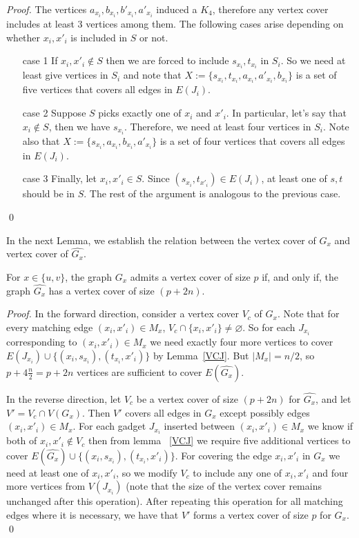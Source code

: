 \documentclass[svgnames]{llncs}
\begin{document}
{\begin{proof}
The vertices $a_{x_i},b_{x_i},b'_{x_i},a'_{x_i}$ induced a $K_4$, therefore any vertex cover includes at least 3 vertices among them. The following cases arise depending on whether $x_i,x'_{i}$ is included in $S$ or not.
\begin{itemize}
 \item [case 1] If $x_i,x'_i \notin S$ then we are forced to include $s_{x_i},t_{x_i}$ in $S_i$. So we need at least give vertices in $S_i$ and note that $X := \{s_{x_i},t_{x_i},a_{x_i},a'_{x_i},b_{x_i}\}$ is a set of five vertices that covers all edges in $E(J_i)$.
 \item [case 2] Suppose $S$ picks exactly one of $x_i$ and $x'_i$. In particular, let's say that $x_i \notin S$, then we have $s_{x_i}$. Therefore, we need at least four vertices in $S_i$. Note also that $X := \{s_{x_i},a_{x_i},b_{x_i},a'_{x_i}\}$ is a set of four vertices that covers all edges in $E(J_i)$.
 \item [case 3]  Finally, let $x_i,x'_i \in S$. Since $(s_{x_i},t_{x'_i}) \in E(J_i)$, at least one of $s,t$ should be in $S$. The rest of the argument is analogous to the previous case.
\end{itemize}
\qed
\end{proof}


In the next Lemma, we establish the relation between the vertex cover of $G_x$ and vertex cover of $\hat{G_{x}}$.

\begin{lemma}
For $x \in \{u,v\}$, the graph $G_x$ admits a vertex cover of size $p$ if, and only if, the graph $\hat{G_x}$ has a vertex cover of size $(p+2n)$.
\label{pvcGin4}
\end{lemma}
\begin{proof}
In the forward direction, consider a vertex cover $V_c$ of $G_x$. Note that for every matching edge $(x_i,x'_i) \in M_x$, $V_c \cap \{x_i,x'_i\} \neq \varnothing$. So for each $J_{x_i}$ corresponding to $(x_i,x'_i) \in M_x$ we need exactly four more vertices to cover $E(J_{x_i}) \cup \{(x_i,s_{x_i}),(t_{x_i},x'_i)\}$ by Lemma~\ref{VCJ}. But $ \lvert M_x \rvert =n/2$, so $p+4\frac{n}{2}=p+2n$ vertices are sufficient to cover $E(\hat{G_x})$.

In the reverse direction, let $V_c$ be a vertex cover of size $(p+2n)$ for $\hat{G_x}$, and let $V'=V_c \cap V(G_x)$. Then $V'$ covers all edges in $G_x$ except possibly edges $(x_i,x'_i) \in M_x$. For each gadget $J_{x_i}$ inserted between $(x_i,x'_i) \in M_x$ we know if both of $x_i,x'_i \notin V_c$ then from lemma ~\ref{VCJ} we require five additional vertices to cover $E(\hat{G_x}) \cup \{(x_i,s_{x_i}),(t_{x_i},x'_i)\}$.
For covering the edge $x_i,x'_i$ in $G_x$ we need at least one of $x_i,x'_i$, so we modify $V_c$ to include any one of $x_i,x'_i$ and four more vertices from $V(J_{x_i})$ (note that the size of the vertex cover remains unchanged after this operation). After repeating this operation for all matching edges where it is necessary, we have that $V'$ forms a vertex cover of size $p$ for $G_x$.
\qed


\end{proof}}
\end{document}
